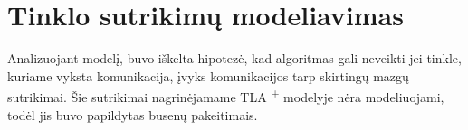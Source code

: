 \section{Tinklo sutrikimų modeliavimas}

Analizuojant modelį, buvo iškelta hipotezė, kad algoritmas gali neveikti jei tinkle, kuriame vyksta komunikacija, įvyks komunikacijos tarp skirtingų mazgų sutrikimai. 
Šie sutrikimai nagrinėjamame TLA \textsuperscript{+} modelyje nėra modeliuojami, todėl jis buvo papildytas busenų pakeitimais.